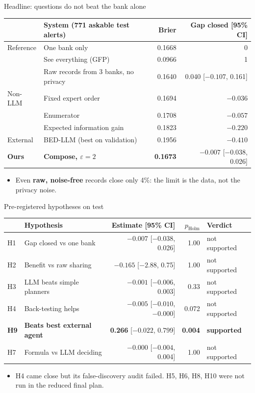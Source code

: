 \documentclass[aspectratio=169,11pt]{beamer}
\newcommand{\eps}{\varepsilon}
\begin{document}
\begin{frame}{Headline: questions do not beat the bank alone}
\centering\small
\begin{tabular}{llrr}
\toprule
& System (771 askable test alerts) & Brier & Gap closed [95\% CI] \\
\midrule
Reference & One bank only & 0.1668 & 0 \\
& See everything (GFP) & 0.0966 & 1 \\
& Raw records from 3 banks, no privacy & 0.1640 & 0.040 [$-0.107$, 0.161] \\
\midrule
Non-LLM & Fixed expert order & 0.1694 & $-0.036$ \\
& Enumerator & 0.1708 & $-0.057$ \\
& Expected information gain & 0.1823 & $-0.220$ \\
\midrule
External & BED-LLM (best on validation) & 0.1956 & {\color{bad}$-0.410$} \\
\midrule
\alert{\textbf{Ours}} & \textbf{Compose, $\eps = 2$} & \textbf{0.1673} & $\mathbf{-0.007}$ [$-0.038$, 0.026] \\
\bottomrule
\end{tabular}
\vspace{8pt}
\begin{itemize}\small
\item Even \textbf{raw, noise-free} records close only 4\%: the limit is the data, not the privacy noise.
\end{itemize}
\end{frame}

\begin{frame}{Pre-registered hypotheses on test}
\centering\small
\begin{tabular}{llrrl}
\toprule
& Hypothesis & Estimate [95\% CI] & $p_\text{Holm}$ & Verdict \\
\midrule
H1 & Gap closed vs one bank & $-0.007$ [$-0.038$, 0.026] & 1.00 & not supported \\
H2 & Benefit vs raw sharing & $-0.165$ [$-2.88$, 0.75] & 1.00 & not supported \\
H3 & LLM beats simple planners & $-0.001$ [$-0.006$, 0.003] & 0.33 & not supported \\
H4 & Back-testing helps & $-0.005$ [$-0.010$, $-0.000$] & 0.072 & not supported \\
\rowcolor{good!12}\textbf{H9} & \textbf{Beats best external agent} & \textbf{0.266} [$-0.022$, 0.799] & \textbf{0.004} & {\color{good}\textbf{supported}} \\
H7 & Formula vs LLM deciding & $-0.000$ [$-0.004$, 0.004] & 1.00 & not supported \\
\bottomrule
\end{tabular}
\vspace{8pt}
\begin{itemize}\small
\item H4 came close but its false-discovery audit failed. H5, H6, H8, H10 were not run in the reduced final plan.
\end{itemize}
\end{frame}
\end{document}
